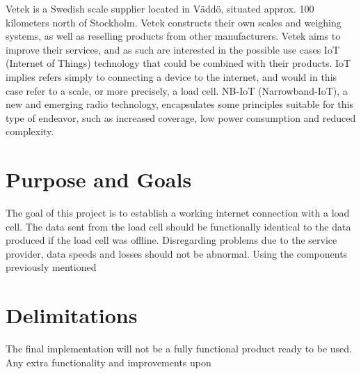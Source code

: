 \iffalse
\begin{itemize}
	\item Identifier names are important
	\item We have two identifier styles
	\item Some history 
	\item Two other studies
	\item Some background on them
	\item Reference all terms introduced
\end{itemize}
\fi

Vetek is a Swedish scale supplier located in Väddö, situated approx. 100 kilometers north of Stockholm. Vetek constructs their own scales and weighing systems, as well as reselling products from other manufacturers. Vetek aims to improve their services, and as such are interested in the possible use cases IoT (Internet of Things) technology that could be combined with their products. IoT implies refers simply to connecting a device to the internet\cite{what_is_iot}, and would in this case refer to a scale, or more precisely, a load cell. NB-IoT (Narrowband-IoT), a new and emerging radio technology, encapsulates some principles suitable for this type of endeavor, such as increased coverage, low power consumption and reduced complexity.\cite{NB-overview}



\section{Purpose and Goals}
\iffalse
\begin{itemize}
	\item Write about the grand scheme of things
	\item Set the correct expectations
	\item What can I expect to learn if I keep on reading?
	\item What are the success criteria for this work?
	\item How will the work be evaluated?
\end{itemize}
\fi

The goal of this project is to establish a working internet connection with a load cell. The data sent from the load cell should be functionally identical to the data produced if the load cell was offline. Disregarding problems due to the service provider, data speeds and losses should not be abnormal. Using the components previously mentioned 


\section{Delimitations}
\iffalse
\begin{itemize}
	\item Scale down expectations and clarify
\end{itemize}
\fi
The final implementation will not be a fully functional product ready to be used. Any extra functionality and improvements upon 